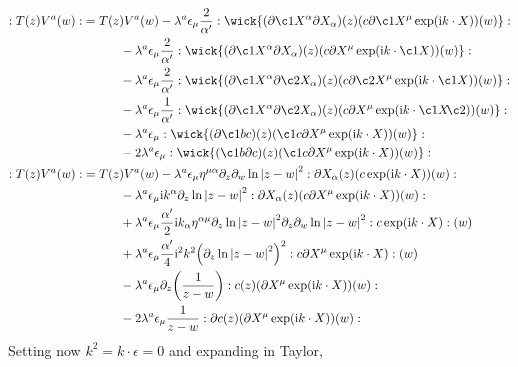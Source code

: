 \begin{align*}
    \cnord{T\qty(z) V^a\qty(w)}&=T\qty(z) V^a\qty(w)-\lambda^a\epsilon_\mu\frac{2}{\alpha'}\cnord{\wick{(\partial\c1 X^\alpha\partial X_\alpha)(z)(c\partial\c1 X^\mu\exp(\im k\cdot X))(w)}}\\
    &\quad\quad\quad-\lambda^a\epsilon_\mu\frac{2}{\alpha'}\cnord{\wick{(\partial\c1 X^\alpha\partial X_\alpha)(z)(c\partial X^\mu\exp(\im k\cdot \c1X))(w)}}\\
    &\quad\quad\quad-\lambda^a\epsilon_\mu\frac{2}{\alpha'}\cnord{\wick{(\partial\c1 X^\alpha\partial\c2 X_\alpha)(z)(c\partial\c2 X^\mu\exp(\im k\cdot \c1X))(w)}}\\
    &\quad\quad\quad-\lambda^a\epsilon_\mu\frac{1}{\alpha'}\cnord{\wick{(\partial\c1 X^\alpha\partial\c2 X_\alpha)(z)(c\partial X^\mu\exp(\im k\cdot \c1X\mkern-4mu \c2 {\mathclap{\phantom{X}}}))(w)}}\\
    &\quad\quad\quad-\lambda^a\epsilon_\mu\cnord{\wick{(\partial \c1 bc)(z)(\c1c\partial X^\mu\exp(\im k\cdot X))(w)}}\\
    &\quad\quad\quad-2\lambda^a\epsilon_\mu\cnord{\wick{(  \c1b\partial c)(z)(\c1c\partial X^\mu\exp(\im k\cdot X))(w)}}\\
    \cnord{T\qty(z) V^a\qty(w)}&=T\qty(z) V^a\qty(w)-\lambda^a\epsilon_\mu\eta^{\mu\alpha}\partial_z\partial_w\ln\abs{z-w}^2\cnord{{\partial X_\alpha(z)(c\exp(\im k\cdot X))(w)}}\\
    &\quad\quad\quad-\lambda^a\epsilon_\mu\im k^\alpha\partial_z\ln\abs{z-w}^2\cnord{{\partial X_\alpha(z)(c\partial X^\mu\exp(\im k\cdot X))(w)}}\\
    &\quad\quad\quad+\lambda^a\epsilon_\mu\frac{\alpha'}{2}\im k_\alpha\eta^{\alpha\mu}\partial_z\ln\abs{z-w}^2\partial_z\partial_w\ln\abs{z-w}^2\cnord{c\exp(\im k\cdot X)}(w)\\
    &\quad\quad\quad+\lambda^a\epsilon_\mu\frac{\alpha'}{4}\im^2 k^2\qty(\partial_z\ln\abs{z-w}^2)^2\cnord{c\partial X^\mu\exp(\im k\cdot X)}(w)\\
    &\quad\quad\quad-\lambda^a\epsilon_\mu\partial_z\qty(\frac{1}{z-w})\cnord{c(z)(\partial X^\mu\exp(\im k\cdot X))(w)}\\
    &\quad\quad\quad-2\lambda^a\epsilon_\mu\frac{1}{z-w}\cnord{\partial c(z)(\partial X^\mu\exp(\im k\cdot X))(w)}
\end{align*}
Setting now $k^2=k\cdot \epsilon=0$ and expanding in Taylor,
